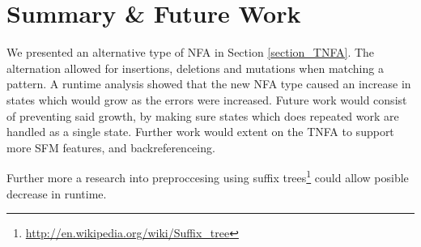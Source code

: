 \section{Summary \& Future Work}
We presented an alternative type of NFA in Section \ref{section_TNFA}.
The alternation allowed for insertions, deletions and mutations when matching a pattern.
A runtime analysis showed that the new NFA type caused an increase in states which would grow as the errors were increased.
Future work would consist of preventing said growth, by making sure states which does repeated work are handled as a single state. 
Further work would extent on the TNFA to support more SFM features, and backreferenceing. 

Further more a research into preproccesing using suffix trees\footnote{\url{http://en.wikipedia.org/wiki/Suffix_tree}} could allow posible decrease in runtime.
